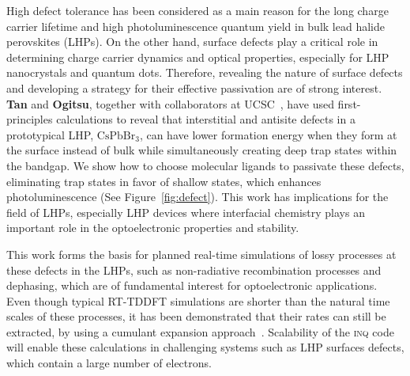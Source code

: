 High defect tolerance has been considered as a main reason for the long charge carrier lifetime and high photoluminescence quantum yield in bulk lead halide perovskites (LHPs). 
On the other hand, surface defects play a critical role in determining charge carrier dynamics and optical properties, especially for LHP nanocrystals and quantum dots. Therefore, revealing the nature of surface defects and developing a strategy for their effective passivation are of strong interest. 
{\bf Tan} and {\bf Ogitsu}, together with collaborators at UCSC~\cite{Smart2021}, have used first-principles calculations to reveal that interstitial and antisite defects in a prototypical LHP, \(\mathrm{CsPbBr_3}\), can have lower formation energy when they form at the surface instead of bulk while simultaneously creating deep trap states within the bandgap.
We show how to choose molecular ligands to passivate these defects, eliminating trap states in favor of shallow states, which enhances photoluminescence 
(See Figure~\ref{fig:defect}). This work has implications for  the field of LHPs, especially LHP devices where interfacial chemistry plays an important role in the optoelectronic properties and stability.

This work forms the basis for planned real-time simulations of lossy processes at these defects in the LHPs, such as non-radiative recombination processes and dephasing, which are of fundamental interest for optoelectronic applications. 
Even though typical RT-TDDFT simulations are shorter than the natural time scales of these processes, it has been demonstrated that their rates can still be extracted, by using a cumulant expansion approach~\cite{Qiao2020}. 
Scalability of the \textsc{inq} code will enable these calculations in challenging systems such as LHP surfaces defects, which contain a large number of electrons.     

